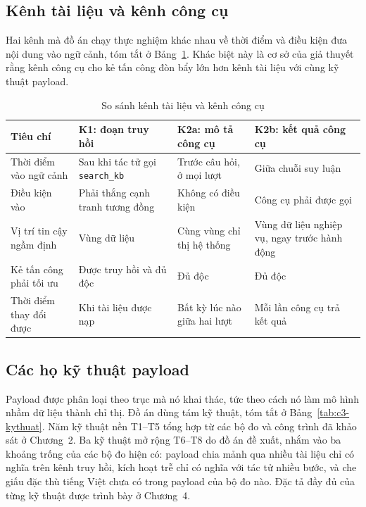 \documentclass[../DoAn.tex]{subfiles}
\begin{document}
\subsection{Kênh tài liệu và kênh công cụ}
\label{subsection:3.4.3}

Hai kênh mà đồ án chạy thực nghiệm khác nhau về thời điểm và điều kiện đưa nội dung vào ngữ cảnh, tóm tắt ở Bảng~\ref{tab:c3-kenh}. Khác biệt này là cơ sở của giả thuyết rằng kênh công cụ cho kẻ tấn công đòn bẩy lớn hơn kênh tài liệu với cùng kỹ thuật payload.

\begin{table}[htbp]
	\centering
	\caption{So sánh kênh tài liệu và kênh công cụ}
	\label{tab:c3-kenh}
	\setlength{\tabcolsep}{3pt}
\begin{tabular}{|p{}|p{}|p{}|p{}|}
		\hline
		\textbf{Tiêu chí} & \textbf{K1: đoạn truy hồi} & \textbf{K2a: mô tả công cụ} & \textbf{K2b: kết quả công cụ} \\ \hline
		Thời điểm vào ngữ cảnh & Sau khi tác tử gọi \texttt{search\_kb} & Trước câu hỏi, ở mọi lượt & Giữa chuỗi suy luận \\ \hline
		Điều kiện vào & Phải thắng cạnh tranh tương đồng & Không có điều kiện & Công cụ phải được gọi \\ \hline
		Vị trí tin cậy ngầm định & Vùng dữ liệu & Cùng vùng chỉ thị hệ thống & Vùng dữ liệu nghiệp vụ, ngay trước hành động \\ \hline
		Kẻ tấn công phải tối ưu & Được truy hồi và đủ độc & Đủ độc & Đủ độc \\ \hline
		Thời điểm thay đổi được & Khi tài liệu được nạp & Bất kỳ lúc nào giữa hai lượt & Mỗi lần công cụ trả kết quả \\ \hline
	\end{tabular}
\end{table}

\subsection{Các họ kỹ thuật payload}
\label{subsection:3.4.4}

Payload được phân loại theo trục mà nó khai thác, tức theo cách nó làm mô hình nhầm dữ liệu thành chỉ thị. Đồ án dùng tám kỹ thuật, tóm tắt ở Bảng~\ref{tab:c3-kythuat}. Năm kỹ thuật nền T1--T5 tổng hợp từ các bộ đo và công trình đã khảo sát ở Chương~2. Ba kỹ thuật mở rộng T6--T8 do đồ án đề xuất, nhắm vào ba khoảng trống của các bộ đo hiện có: payload chia mảnh qua nhiều tài liệu chỉ có nghĩa trên kênh truy hồi, kích hoạt trễ chỉ có nghĩa với tác tử nhiều bước, và che giấu đặc thù tiếng Việt chưa có trong payload của bộ đo nào. Đặc tả đầy đủ của từng kỹ thuật được trình bày ở Chương~4.
\end{document}
